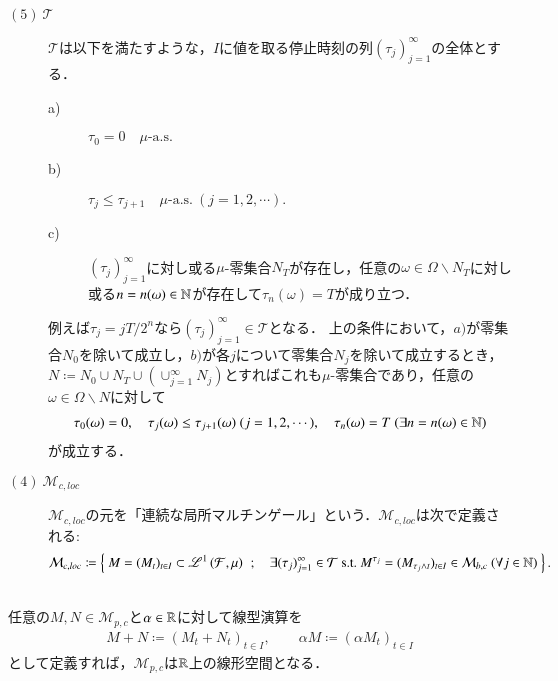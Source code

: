 \begin{description}
		\item[$\mathrm{(5)}\ \mathcal{T}$]
			$\mathcal{T}$は以下を満たすような，$I$に値を取る停止時刻の列$(\tau_j)_{j=1}^{\infty}$の全体とする．
			\begin{description}
				\item[a)] $\tau_0 = 0 \quad \mbox{$\mu$-a.s.}$
				\item[b)] $\tau_j \leq \tau_{j+1} \quad \mbox{$\mu$-a.s.}\ (j=1,2,\cdots).$
				\item[c)] $(\tau_j)_{j=1}^{\infty}$に対し或る$\mu$-零集合$N_T$が存在し，任意の$\omega \in \Omega \backslash N_T$に対し或る$n = n(\omega) \in \mathbb{N}$が存在して$\tau_n(\omega)=T$が成り立つ．
			\end{description}
			例えば$\tau_j = jT/2^n$なら$(\tau_j)_{j=1}^{\infty} \in \mathcal{T}$となる．
			上の条件において，$a)$が零集合$N_0$を除いて成立し，$b)$が各$j$について零集合$N_j$を除いて成立するとき，
			$N \coloneqq N_0 \cup N_T \cup (\cup_{j=1}^{\infty}N_j)$とすればこれも$\mu$-零集合であり，任意の$\omega \in \Omega \backslash N$に対して
			\begin{align}
				\tau_0(\omega) = 0,\quad \tau_j(\omega) \leq \tau_{j+1}(\omega)\ (j=1,2,\cdots),\quad
				\tau_n(\omega) = T\ (\exists n = n(\omega) \in \mathbb{N})
			\end{align}
			が成立する．
			
		\item[$\mathrm{(4)}\ \mathcal{M}_{c,loc}$]
			$\mathcal{M}_{c,loc}$の元を「連続な局所マルチンゲール」という．$\mathcal{M}_{c,loc}$は次で定義される:
			\begin{align}
				\mathcal{M}_{c,loc} \coloneqq 
				\left\{\ M = (M_t)_{t \in I} \subset \mathscr{L}^{1} \left(\mathcal{F},\mu\right)\ \, ; \quad \exists (\tau_j)_{j=1}^{\infty} \in \mathcal{T}\ \mathrm{s.t.}\ M^{\tau_j} = (M_{\tau_j \wedge t})_{t \in I} \in \mathcal{M}_{b,c}\ (\forall j \in \mathbb{N})\ \right\}.
			\end{align}
	\end{description}
	
	\begin{itembox}[l]{}
		\begin{lem}\mbox{}\\
			任意の$M,N \in \mathcal{M}_{p,c}$と$\alpha \in \mathbb{R}$に対して線型演算を
			\begin{align}
				M + N \coloneqq (M_t + N_t)_{t \in I}, \qquad \alpha M \coloneqq (\alpha M_t)_{t \in I}
				\label{eq:mart_linear_arithmetic_0}
			\end{align}
			として定義すれば，$\mathcal{M}_{p,c}$は$\mathbb{R}$上の線形空間となる．
		\end{lem}
	\end{itembox}
	
